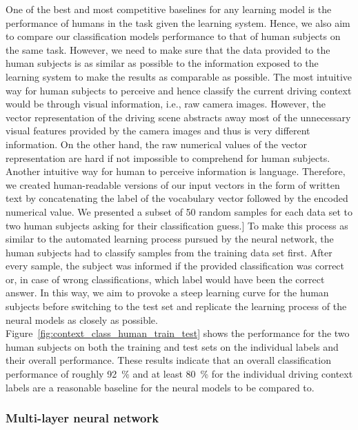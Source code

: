 One of the best and most competitive baselines for any learning model is the performance of humans in the task given the learning system.
Hence, we also aim to compare our classification models performance to that of human subjects on the same task.
However, we need to make sure that the data provided to the human subjects is as similar as possible to the information exposed to the learning system to make the results as comparable as possible.
The most intuitive way for human subjects to perceive and hence classify the current driving context would be through visual information, i.e., raw camera images.
However, the vector representation of the driving scene abstracts away most of the unnecessary visual features provided by the camera images and thus is very different information.
On the other hand, the raw numerical values of the vector representation are hard if not impossible to comprehend for human subjects.
Another intuitive way for human to perceive information is language.
Therefore, we created human-readable versions of our input vectors in the form of written text by concatenating the label of the vocabulary vector followed by the encoded numerical value.
We presented a subset of \num{50} random samples for each data set to two human subjects asking for their classification guess.]
To make this process as similar to the automated learning process pursued by the neural network, the human subjects had to classify samples from the training data set first.
After every sample, the subject was informed if the provided classification was correct or, in case of wrong classifications, which label would have been the correct answer.
In this way, we aim to provoke a steep learning curve for the human subjects before switching to the test set and replicate the learning process of the neural models as closely as possible.
Figure~\ref{fig:context_class_human_train_test} shows the performance for the two human subjects on both the training and test sets on the individual labels and their overall performance.
These results indicate that an overall classification performance of roughly \SI{92}{\percent} and at least \SI{80}{\percent} for the individual driving context labels are a reasonable baseline for the neural models to be compared to.

\subsubsection{Multi-layer neural network}%
\label{ssubsec:multi_layer_neural_network}

